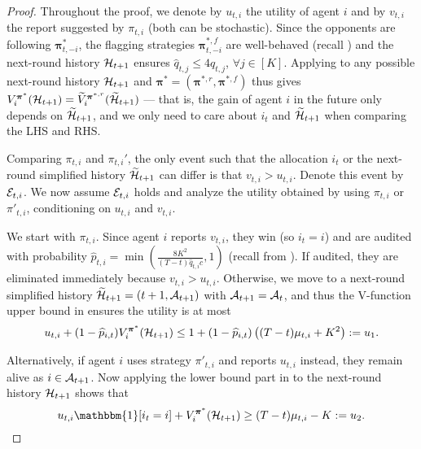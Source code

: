 \begin{proof}
Throughout the proof, we denote by $u_{t,i}$ the utility of agent $i$ and by $v_{t,i}$ the report suggested by $\pi_{t,i}$ (both can be stochastic).
Since the opponents are following $\bm \pi_{t,-i}^\ast$, the flagging strategies ${\bm \pi}_{t,-i}^{\ast,f}$ are well-behaved (recall ) and the next-round history $\mathcal{H}_{t+1}$ ensures $\hat q_{t,j}\le 4q_{t,j}$, $\forall j\in [K]$. Applying  to any possible next-round history $\mathcal{H}_{t+1}$ and $\bm \pi^\ast=({\bm \pi}^{\ast,r},{\bm \pi}^{\ast,f})$ thus gives $V_i^{\bm \pi^\ast}(\mathcal{H}_{t+1})=\widetilde V_i^{{\bm \pi}^{\ast,r}}(\widetilde {\mathcal{H}}_{t+1})$ --- that is, the gain of agent $i$ in the future only depends on $\widetilde {\mathcal{H}}_{t+1}$, and we only need to care about $i_t$ and $\widetilde {\mathcal{H}}_{t+1}$ when comparing the LHS and RHS.

Comparing $\pi_{t,i}$ and $\pi_{t,i}'$, the only event such that the allocation $i_t$ or the next-round simplified history $\widetilde{\mathcal{H}}_{t+1}$ can differ is that $v_{t,i}>u_{t,i}$. Denote this event by $\mathcal{E}_{t,i}$.
We now assume $\mathcal{E}_{t,i}$ holds and analyze the utility obtained by using $\pi_{t,i}$ or $\pi'_{t,i}$, conditioning on $u_{t,i}$ and $v_{t,i}$. 

We start with $\pi_{t,i}$. Since agent $i$ reports $v_{t,i}$, they win (so $i_t=i$) and are audited with probability $\hat p_{t,i}=\min(\frac{8K^2}{(T-t)\hat q_{t,i} c},1)$ (recall  from ). If audited, they are eliminated immediately because $v_{t,i}>u_{t,i}$. Otherwise, we move to a next-round simplified history $\widetilde {\mathcal{H}}_{t+1}=(t+1,\mathcal{A}_{t+1})$ with $\mathcal{A}_{t+1}=\mathcal{A}_t$, and thus the V-function upper bound in  ensures the utility is at most
\begin{equation*}
u_{t,i}+(1-\widehat p_{i,t}) V_i^{\bm \pi^\ast}({\mathcal{H}}_{t+1})\le 1 + (1-\widehat p_{i,t})\left( (T-t) \mu_{t,i}+K^2 \right) := u_1.
\end{equation*}

Alternatively, if agent $i$ uses strategy $\pi'_{t,i}$ and reports $u_{t,i}$ instead, they remain alive as $i\in\mathcal{A}_{t+1}$. Now applying the lower bound part in  to the next-round history $\mathcal{H}_{t+1}$ shows that
\begin{equation*}
u_{t,i}\mathbbm{1}[i_t=i]+V_i^{{\bm \pi}^\ast}({\mH}_{t+1})\ge (T-t) \mu_{t,i}-K:=u_2.
\end{equation*}


\end{proof}
